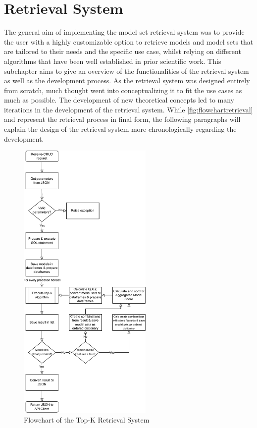 \section{Retrieval System}\label{sec:designretrieval}

The general aim of implementing the model set retrieval system was to provide the user with a highly customizable option to retrieve models and model sets that are tailored to their needs and the specific use case, whilst relying on different algorithms that have been well established in prior scientific work. This subchapter aims to give an overview of the functionalities of the retrieval system as well as the development process. As the retrieval system was designed entirely from scratch, much thought went into conceptualizing it to fit the use cases as much as possible. The development of new theoretical concepts led to many iterations in the development of the retrieval system. While \autoref{fig:flowchartretrieval} and  represent the retrieval process in final form, the following paragraphs will explain the design of the retrieval system more chronologically regarding the development. %

\begin{figure}[htbp]
  \centering
\includegraphics[height=14cm]{graphics/flowchartretrieval.pdf}
  \caption{Flowchart of the Top-K Retrieval System}
  \label{fig:flowchartretrieval}
\end{figure}

